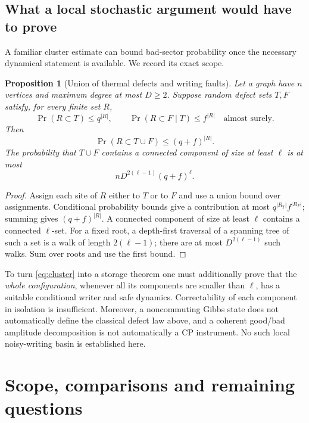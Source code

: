 \documentclass[11pt,reqno]{amsart}
\numberwithin{equation}{section}
\newtheorem{proposition}[theorem]{Proposition}
\theoremstyle{definition}
\theoremstyle{remark}
\begin{document}
\subsection{What a local stochastic argument would have to prove}

A familiar cluster estimate can bound bad-sector probability once the
necessary dynamical statement is available. We record its exact scope.

\begin{proposition}[Union of thermal defects and writing faults]
\label{prop:cluster}
Let a graph have \(n\) vertices and maximum degree at most \(D\ge2\).
Suppose random defect sets \(T,F\) satisfy, for every finite set \(R\),
\[
 \Pr(R\subset T)\le q^{|R|},\qquad
 \Pr(R\subset F\mid T)\le f^{|R|}
 \quad\text{almost surely}.
\]
Then
\[
 \Pr(R\subset T\cup F)\le(q+f)^{|R|}.
\]
The probability that \(T\cup F\) contains a connected component of size
at least \(\ell\) is at most
\begin{equation}\label{eq:cluster}
                 nD^{2(\ell-1)}(q+f)^\ell .
\end{equation}
\end{proposition}
\begin{proof}
Assign each site of \(R\) either to \(T\) or to \(F\) and use a union
bound over assignments. Conditional probability bounds give a contribution
at most \(q^{|R_T|}f^{|R_F|}\); summing gives \((q+f)^{|R|}\).
A connected component of size at least \(\ell\) contains a connected
\(\ell\)-set. For a fixed root, a depth-first traversal of a spanning
tree of such a set is a walk of length \(2(\ell-1)\); there are at most
\(D^{2(\ell-1)}\) such walks. Sum over roots and use the first bound.
\end{proof}

To turn \eqref{eq:cluster} into a storage theorem one must additionally
prove that the \emph{whole configuration}, whenever all its components are
smaller than \(\ell\), has a suitable conditional writer and safe dynamics.
Correctability of each component in isolation is insufficient.
Moreover, a noncommuting Gibbs state does not automatically define the
classical defect law above, and a coherent good/bad amplitude decomposition
is not automatically a CP instrument.
No such local noisy-writing basin is established here.

\section{Scope, comparisons and remaining questions}\label{sec:discussion}
\end{document}
